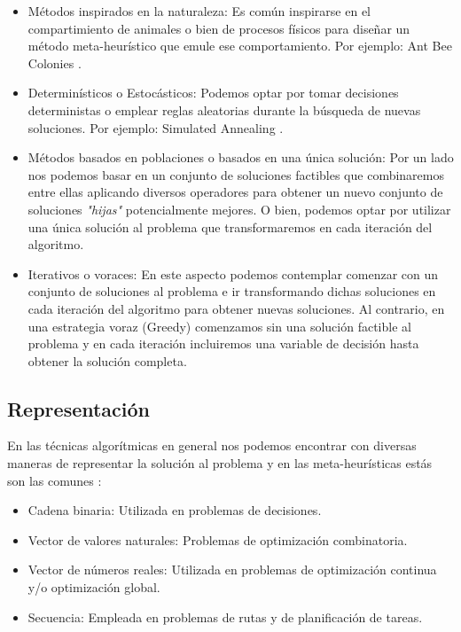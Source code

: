 \begin{itemize}
    \item Métodos inspirados en la naturaleza: Es común inspirarse en el compartimiento de animales o bien de procesos físicos para diseñar un método meta-heurístico que emule ese comportamiento. Por ejemplo: Ant Bee Colonies \cite{Mann2017}.
    \item Determinísticos o Estocásticos: Podemos optar por tomar decisiones deterministas o emplear reglas aleatorias durante la búsqueda de nuevas soluciones. Por ejemplo: Simulated Annealing \cite{SA1}.
    \item Métodos basados en poblaciones o basados en una única solución: Por un lado nos podemos basar en un conjunto de soluciones factibles que combinaremos entre ellas aplicando diversos operadores para obtener un  nuevo conjunto de soluciones \textit{"hijas"} potencialmente mejores. O bien, podemos optar por utilizar una única solución al problema que transformaremos en cada iteración del algoritmo.
    \item Iterativos o voraces: En este aspecto podemos contemplar comenzar con un conjunto de soluciones al problema e ir transformando dichas soluciones en cada iteración del algoritmo para obtener nuevas soluciones. Al contrario, en una estrategia voraz (Greedy) comenzamos sin una solución factible al problema y en cada iteración incluiremos una variable de decisión hasta obtener la solución completa.
\end{itemize}

\subsection{Representación}

En las técnicas algorítmicas en general nos podemos encontrar con diversas maneras de representar la solución al problema y en las meta-heurísticas estás son las comunes \cite{metaheuristics}:

\bigskip

\begin{itemize}
    \item Cadena binaria: Utilizada en problemas de decisiones. 
    \item Vector de valores naturales: Problemas de optimización combinatoria.
    \item Vector de números reales: Utilizada en problemas de optimización continua y/o optimización global.
    \item Secuencia: Empleada en problemas de rutas y de planificación de tareas.
\end{itemize}

